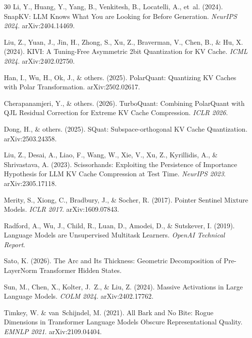 \documentclass[11pt]{article}
\begin{document}
\begin{thebibliography}{30}
Li, Y., Huang, Y., Yang, B., Venkitesh, B., Locatelli, A., et~al. (2024).
\newblock SnapKV: LLM Knows What You are Looking for Before Generation.
\newblock \emph{NeurIPS 2024}. arXiv:2404.14469.

Liu, Z., Yuan, J., Jin, H., Zhong, S., Xu, Z., Braverman, V., Chen, B., \& Hu, X. (2024).
\newblock KIVI: A Tuning-Free Asymmetric 2bit Quantization for KV Cache.
\newblock \emph{ICML 2024}. arXiv:2402.02750.

Han, I., Wu, H., Ok, J., \& others. (2025).
\newblock PolarQuant: Quantizing KV Caches with Polar Transformation.
\newblock arXiv:2502.02617.

Cherapanamjeri, Y., \& others. (2026).
\newblock TurboQuant: Combining PolarQuant with QJL Residual Correction for Extreme KV Cache Compression.
\newblock \emph{ICLR 2026}.

Dong, H., \& others. (2025).
\newblock SQuat: Subspace-orthogonal KV Cache Quantization.
\newblock arXiv:2503.24358.

Liu, Z., Desai, A., Liao, F., Wang, W., Xie, V., Xu, Z., Kyrillidis, A., \& Shrivastava, A. (2023).
\newblock Scissorhands: Exploiting the Persistence of Importance Hypothesis for LLM KV Cache Compression at Test Time.
\newblock \emph{NeurIPS 2023}. arXiv:2305.17118.

Merity, S., Xiong, C., Bradbury, J., \& Socher, R. (2017).
\newblock Pointer Sentinel Mixture Models.
\newblock \emph{ICLR 2017}. arXiv:1609.07843.

Radford, A., Wu, J., Child, R., Luan, D., Amodei, D., \& Sutskever, I. (2019).
\newblock Language Models are Unsupervised Multitask Learners.
\newblock \emph{OpenAI Technical Report}.

Sato, K. (2026).
\newblock The Arc and Its Thickness: Geometric Decomposition of Pre-LayerNorm Transformer Hidden States.

Sun, M., Chen, X., Kolter, J.~Z., \& Liu, Z. (2024).
\newblock Massive Activations in Large Language Models.
\newblock \emph{COLM 2024}. arXiv:2402.17762.

Timkey, W. \& van~Schijndel, M. (2021).
\newblock All Bark and No Bite: Rogue Dimensions in Transformer Language Models Obscure Representational Quality.
\newblock \emph{EMNLP 2021}. arXiv:2109.04404.


\end{thebibliography}
\end{document}
